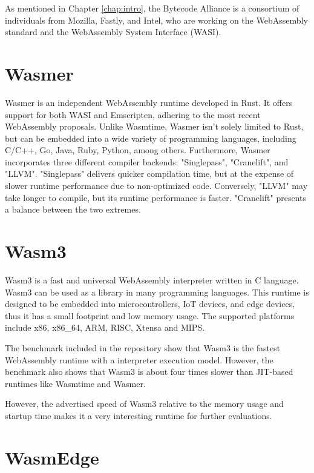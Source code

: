 As mentioned in Chapter \ref{chap:intro}, the Bytecode Alliance is a consortium of individuals from Mozilla, Fastly, and Intel, who are working on the WebAssembly standard and the WebAssembly System Interface (WASI).

\section{Wasmer}
\label{sec:wasmer}

Wasmer \cite{wasmerinc_2023_wasmer} is an independent WebAssembly runtime developed in Rust. It offers support for both WASI and Emscripten, adhering to the most recent WebAssembly proposals. Unlike Wasmtime, Wasmer isn't solely limited to Rust, but can be embedded into a wide variety of programming languages, including C/C++, Go, Java, Ruby, Python, among others. Furthermore, Wasmer incorporates three different compiler backends: "Singlepass", "Cranelift", and "\gls{LLVM}". "Singlepass" delivers quicker compilation time, but at the expense of slower runtime performance due to non-optimized code. Conversely, "LLVM" may take longer to compile, but its runtime performance is faster. "Cranelift" presents a balance between the two extremes.

\section{Wasm3}
\label{sec:wasm3}

Wasm3 \cite{shymanskyy_2023_wasm3} is a fast and universal WebAssembly interpreter written in C language. Wasm3 can be used as a library in many programming languages. This runtime is designed to be embedded into microcontrollers, IoT devices, and edge devices, thus it has a small footprint and low memory usage. The supported platforms include x86, x86\_64, ARM, RISC, Xtensa and MIPS.

The benchmark included in the repository \cite{shymanskyy_2023_wasm3} show that Wasm3 is the fastest \gls{WebAssembly} runtime with a interpreter execution model. However, the benchmark also shows that Wasm3 is about four times slower than JIT-based runtimes like Wasmtime and Wasmer. 

However, the advertised speed of Wasm3 relative to the memory usage and startup time makes it a very interesting runtime for further evaluations.

\section{WasmEdge}
\label{sec:wasmedge}

